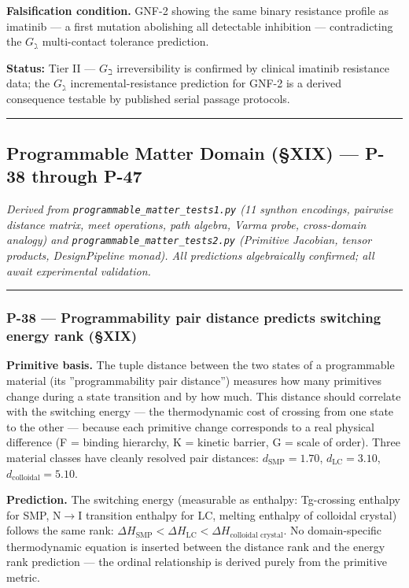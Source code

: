 \documentclass[12pt,a4paper]{article}
\begin{document}
\textbf{Falsification condition.} GNF-2 showing the same binary resistance profile as imatinib --- a first mutation abolishing all detectable inhibition --- contradicting the $G_\gimel$ multi-contact tolerance prediction.

\textbf{Status:} Tier II --- $G_\beth$ irreversibility is confirmed by clinical imatinib resistance data; the $G_\gimel$ incremental-resistance prediction for GNF-2 is a derived consequence testable by published serial passage protocols.

\begin{center}
\rule{0.5\textwidth}{0.4pt}
\end{center}

\subsection{Programmable Matter Domain (§XIX) --- P-38 through P-47}

\emph{Derived from \texttt{programmable\_matter\_tests1.py} (11 synthon encodings, pairwise distance matrix, meet operations, path algebra, Varma probe, cross-domain analogy) and \texttt{programmable\_matter\_tests2.py} (Primitive Jacobian, tensor products, DesignPipeline monad). All predictions algebraically confirmed; all await experimental validation.}

\begin{center}
\rule{0.5\textwidth}{0.4pt}
\end{center}

\subsubsection{P-38 --- Programmability pair distance predicts switching energy rank (§XIX)}

\textbf{Primitive basis.} The tuple distance between the two states of a programmable material (its ''programmability pair distance'') measures how many primitives change during a state transition and by how much. This distance should correlate with the switching energy --- the thermodynamic cost of crossing from one state to the other --- because each primitive change corresponds to a real physical difference (F = binding hierarchy, K = kinetic barrier, G = scale of order). Three material classes have cleanly resolved pair distances: $d_{\text{SMP}} = 1.70$, $d_{\text{LC}} = 3.10$, $d_{\text{colloidal}} = 5.10$.

\textbf{Prediction.} The switching energy (measurable as enthalpy: Tg-crossing enthalpy for SMP, N$\rightarrow$I transition enthalpy for LC, melting enthalpy of colloidal crystal) follows the same rank: $\Delta H_{\text{SMP}} < \Delta H_{\text{LC}} < \Delta H_{\text{colloidal crystal}}$. No domain-specific thermodynamic equation is inserted between the distance rank and the energy rank prediction --- the ordinal relationship is derived purely from the primitive metric.
\end{document}
